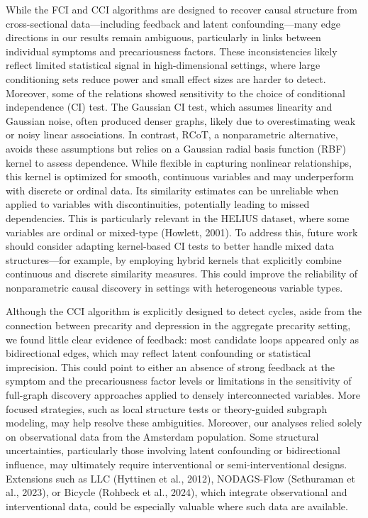 \documentclass[
]{article}
\begin{document}
While the FCI and CCI algorithms are designed to recover causal
structure from cross-sectional data---including feedback and latent
confounding---many edge directions in our results remain ambiguous,
particularly in links between individual symptoms and precariousness
factors. These inconsistencies likely reflect limited statistical signal
in high-dimensional settings, where large conditioning sets reduce power
and small effect sizes are harder to detect. Moreover, some of the
relations showed sensitivity to the choice of conditional independence
(CI) test. The Gaussian CI test, which assumes linearity and Gaussian
noise, often produced denser graphs, likely due to overestimating weak
or noisy linear associations. In contrast, RCoT, a nonparametric
alternative, avoids these assumptions but relies on a Gaussian radial
basis function (RBF) kernel to assess dependence. While flexible in
capturing nonlinear relationships, this kernel is optimized for smooth,
continuous variables and may underperform with discrete or ordinal data.
Its similarity estimates can be unreliable when applied to variables
with discontinuities, potentially leading to missed dependencies. This
is particularly relevant in the HELIUS dataset, where some variables are
ordinal or mixed-type (Howlett, 2001). To address this, future work
should consider adapting kernel-based CI tests to better handle mixed
data structures---for example, by employing hybrid kernels that
explicitly combine continuous and discrete similarity measures. This
could improve the reliability of nonparametric causal discovery in
settings with heterogeneous variable types.

Although the CCI algorithm is explicitly designed to detect cycles,
aside from the connection between precarity and depression in the
aggregate precarity setting, we found little clear evidence of feedback:
most candidate loops appeared only as bidirectional edges, which may
reflect latent confounding or statistical imprecision. This could point
to either an absence of strong feedback at the symptom and the
precariousness factor levels or limitations in the sensitivity of
full-graph discovery approaches applied to densely interconnected
variables. More focused strategies, such as local structure tests or
theory-guided subgraph modeling, may help resolve these ambiguities.
Moreover, our analyses relied solely on observational data from the
Amsterdam population. Some structural uncertainties, particularly those
involving latent confounding or bidirectional influence, may ultimately
require interventional or semi-interventional designs. Extensions such
as LLC (Hyttinen et al., 2012), NODAGS-Flow (Sethuraman et al., 2023),
or Bicycle (Rohbeck et al., 2024), which integrate observational and
interventional data, could be especially valuable where such data are
available.
\end{document}

